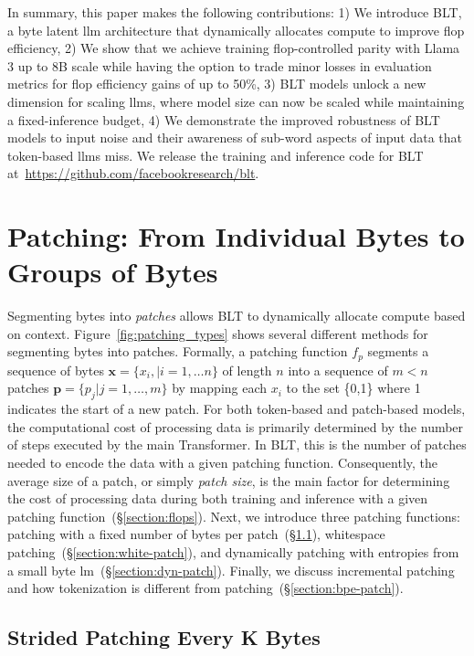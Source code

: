 In summary, this paper makes the following contributions: 1) We introduce {\textsc BLT}, a byte latent llm architecture that dynamically allocates compute to improve flop efficiency, 2) We show that we achieve training flop-controlled parity with Llama 3 up to 8B scale while having the option to trade minor losses in evaluation metrics for flop efficiency gains of up to 50\%, 3) {\textsc BLT} models unlock a new dimension for scaling llms, where model size can now be scaled while maintaining a fixed-inference budget, 4) We demonstrate the improved robustness of {\textsc BLT} models to input noise and their awareness of sub-word aspects of input data that token-based llms miss. We release the training and inference code for {\textsc BLT}  at~\url{https://github.com/facebookresearch/blt}.

\section{Patching: From Individual Bytes to Groups of Bytes}
\label{section:patching}

Segmenting bytes into \textit{patches} allows {\textsc BLT} to dynamically allocate compute based on context.
Figure~\ref{fig:patching_types} shows several different methods for segmenting bytes into patches. Formally, a patching function $f_p$ segments a sequence of bytes $\pmb{x}=\{x_i,|i=1,\ldots n\}$ of length $n$ into a sequence of $m < n$ patches $\pmb{p}=\{p_j|j=1,\ldots,m\}$ by mapping each $x_i$ to the set \{0,1\} where 1 indicates the start of a new patch. For both token-based and patch-based models, the computational cost of processing data is primarily determined by the number of steps executed by the main Transformer. In {\textsc BLT}, this is the number of patches needed to encode the data with a given patching function. Consequently, the average size of a patch, or simply \textit{patch size}, is the main factor for determining the cost of processing data during both training and inference with a given patching function~(\S\ref{section:flops}).
Next, we introduce three patching functions: patching with a fixed number of bytes per patch~(\S\ref{section:static-patch}), whitespace patching~(\S\ref{section:white-patch}), and dynamically patching with entropies from a small byte lm~(\S\ref{section:dyn-patch}). Finally, we discuss incremental patching and how tokenization is different from patching~(\S\ref{section:bpe-patch}).

\subsection{Strided Patching Every K Bytes}
\label{section:static-patch}

